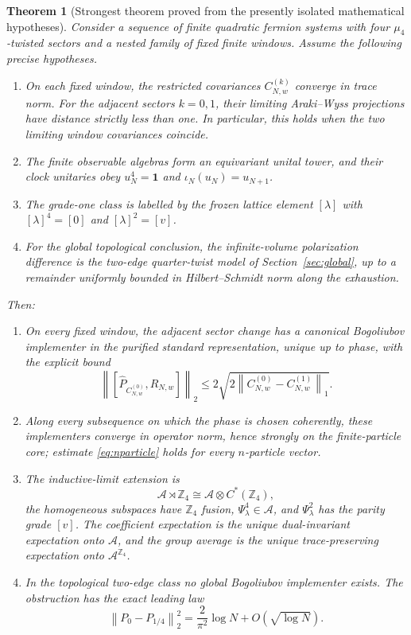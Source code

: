\documentclass[11pt]{article}
\newtheorem{theorem}{Theorem}[section]
\theoremstyle{remark}
\newcommand{\id}{\mathbf 1}
\newcommand{\A}{\mathcal A}
\newcommand{\norm}[1]{\left\lVert #1\right\rVert}
\begin{document}
\begin{theorem}[Strongest theorem proved from the presently isolated
mathematical hypotheses]\label{thm:main}
Consider a sequence of finite quadratic fermion systems with four
$\mu_4$-twisted sectors and a nested family of fixed finite windows.
Assume the following precise hypotheses.
\begin{enumerate}[label=(H\arabic*)]
\item On each fixed window, the restricted covariances
$C_{N,w}^{(k)}$ converge in trace norm.  For the adjacent sectors
$k=0,1$, their limiting Araki--Wyss projections have distance strictly
less than one.  In particular, this holds when the two limiting window
covariances coincide.
\item The finite observable algebras form an equivariant unital tower,
and their clock unitaries obey
$u_N^4=\id$ and $\iota_N(u_N)=u_{N+1}$.
\item The grade-one class is labelled by the frozen lattice element
$[\lambda]$ with $[\lambda]^4=[0]$ and $[\lambda]^2=[v]$.
\item For the global topological conclusion, the infinite-volume
polarization difference is the two-edge quarter-twist model of
Section~\ref{sec:global}, up to a remainder uniformly bounded in
Hilbert--Schmidt norm along the exhaustion.
\end{enumerate}
Then:
\begin{enumerate}[label=\textup{(\alph*)}]
\item On every fixed window, the adjacent sector change has a canonical
Bogoliubov implementer in the purified standard representation, unique
up to phase, with the explicit bound
\[
\norm{[\widehat P_{C_{N,w}^{(0)}},R_{N,w}]}_2
\le2\sqrt{2\norm{C_{N,w}^{(0)}-C_{N,w}^{(1)}}_1}.
\]
\item Along every subsequence on which the phase is chosen coherently,
these implementers converge in operator norm, hence strongly on the
finite-particle core; estimate \eqref{eq:nparticle} holds for every
$n$-particle vector.
\item The inductive-limit extension is
\[
\A\rtimes\mathbb Z_4\cong\A\otimes C^*(\mathbb Z_4),
\]
the homogeneous subspaces have $\mathbb Z_4$ fusion,
$\Psi_\lambda^4\in\A$, and $\Psi_\lambda^2$ has the parity grade
$[v]$.  The coefficient expectation is the unique dual-invariant
expectation onto $\A$, and the group average is the unique
trace-preserving expectation onto $\A^{\mathbb Z_4}$.
\item In the topological two-edge class no global Bogoliubov implementer
exists.  The obstruction has the exact leading law
\[
\norm{P_0-P_{1/4}}_2^2
=\frac2{\pi^2}\log N+O(\sqrt{\log N}).
\]
\end{enumerate}
\end{theorem}
\end{document}
